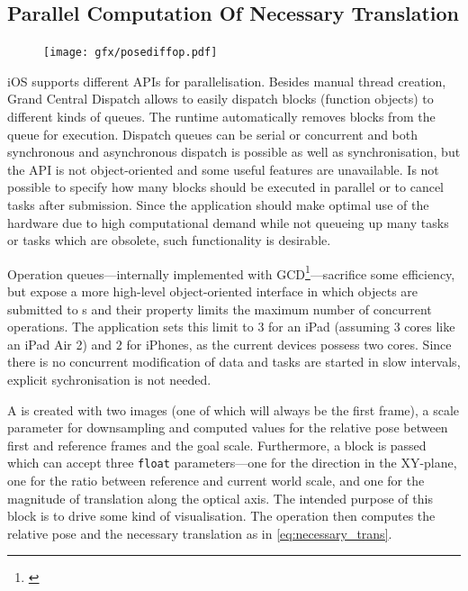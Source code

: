 \subsection{Parallel Computation Of Necessary Translation}

\begin{figure}
   \texttt{[image: gfx/posediffop.pdf]}
\end{figure}
iOS supports different APIs for parallelisation. Besides manual thread creation,
Grand Central Dispatch allows to easily dispatch blocks (function objects) to
different kinds of queues. The runtime automatically removes blocks from the
queue for execution. Dispatch queues can be serial or concurrent and both
synchronous and asynchronous dispatch is possible as well as synchronisation,
but the API is not object-oriented and some useful features are unavailable.  Is
not possible to specify how many blocks should be executed in parallel or to
cancel tasks after submission. Since the application should make optimal use of
the hardware due to high computational demand while not queueing up many tasks
or tasks which are obsolete, such functionality is desirable.

Operation queues---internally implemented with
GCD\footnote{\citep{nsopgcd}}---sacrifice some efficiency, but expose a more
high-level object-oriented interface in which  objects are
submitted to s and their
 property limits the maximum number of
concurrent operations. The application sets this limit to $3$ for an iPad
(assuming $3$ cores like an iPad Air 2) and $2$ for iPhones, as the current
devices possess two cores. Since there is no concurrent modification of data and
tasks are started in slow intervals, explicit sychronisation is not needed.

A  is created with two images (one of
which will always be the first frame), a scale parameter for downsampling and
computed values for the relative pose between first and reference frames and the
goal scale. Furthermore, a block is passed which can accept three \texttt{float}
parameters---one for the direction in the XY-plane, one for the ratio between
reference and current world scale, and one for the magnitude of translation along
the optical axis. The intended purpose of this block is to drive some kind of
visualisation. The operation then computes the relative pose and the necessary
translation as in \eqref{eq:necessary_trans}. 


